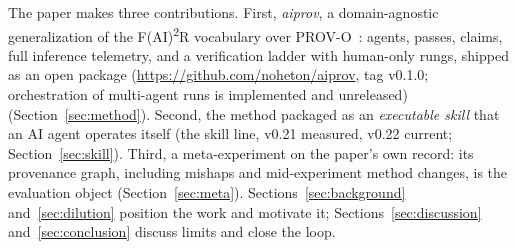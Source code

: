 The paper makes three contributions. First, \emph{aiprov}, a
domain-agnostic generalization of the F(AI)\textsuperscript{2}R
vocabulary over PROV-O~\cite{prov-o2013}: agents, passes, claims, full
inference telemetry, and a verification ladder with human-only rungs,
shipped as an open package (\url{https://github.com/noheton/aiprov},
tag v0.1.0; orchestration of multi-agent runs is implemented and
unreleased) (Section~\ref{sec:method}). Second, the method packaged as
an \emph{executable skill} that an AI agent operates itself (the skill
line, v0.21 measured, v0.22 current; Section~\ref{sec:skill}). Third, a
meta-experiment on the paper's own record: its provenance graph,
including mishaps and mid-experiment method changes, is the evaluation
object (Section~\ref{sec:meta}). Sections~\ref{sec:background}
and~\ref{sec:dilution} position the work and motivate it;
Sections~\ref{sec:discussion} and~\ref{sec:conclusion} discuss limits
and close the loop.
